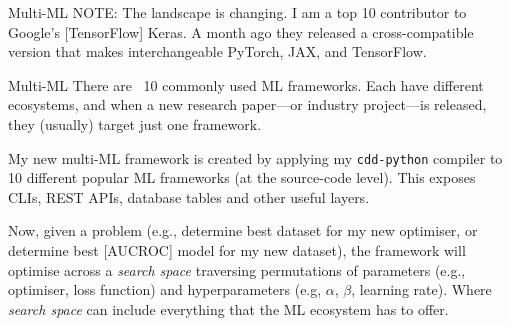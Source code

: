 \documentclass[aspectratio=169,xcolor=dvipsnames]{beamer}
\begin{document}
\begin{frame}{Multi-ML}
	NOTE: The landscape is changing. I am a top 10 contributor to Google's [TensorFlow] Keras. A month ago they released a cross-compatible version that makes interchangeable PyTorch, JAX, and TensorFlow.
\end{frame}

\begin{frame}{Multi-ML}
	There are ~10 commonly used ML frameworks. Each have different ecosystems, and when a new research paper---or industry project---is released, they (usually) target just one framework.\vspace{1em}

	My new multi-ML framework is created by applying my \texttt{cdd-python} compiler to 10 different popular ML frameworks (at the source-code level). This exposes CLIs, REST APIs, database tables and other useful layers.\vspace{1em}

	Now, given a problem (e.g., determine best dataset for my new optimiser, or determine best [AUCROC] model for my new dataset), the framework will optimise across a \textit{search space} traversing permutations of parameters (e.g., optimiser, loss function) and hyperparameters (e.g, \(\alpha\), \(\beta\), learning rate). Where \textit{search space} can include everything that the ML ecosystem has to offer.
\end{frame}

{
\begin{frame}[plain]
\end{frame}
}
\end{document}
